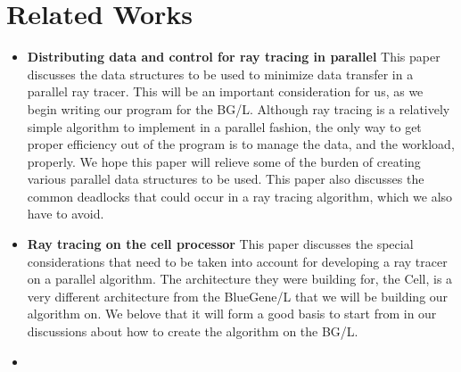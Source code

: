 \documentclass{acmsiggraph}
\begin{document}
\section*{Related Works}

\begin{itemize}
\item
\textbf{Distributing data and control for ray tracing in parallel} This paper
discusses the data structures to be used to minimize data transfer in a
parallel ray tracer. This will be an important consideration for us, as we
begin writing our program for the BG/L. Although ray tracing is a relatively
simple algorithm to implement in a parallel fashion, the only way to get proper
efficiency out of the program is to manage the data, and the workload,
properly. We hope this paper will relieve some of the burden of creating
various parallel data structures to be used. This paper also discusses the
common deadlocks that could occur in a ray tracing algorithm, which we also
have to avoid.\cite{badouel1994dda}
\item
\textbf{Ray tracing on the cell processor} This paper discusses the special
considerations that need to be taken into account for developing a ray tracer
on a parallel algorithm. The architecture they were building for, the Cell, is
a very different architecture from the BlueGene/L that we will be building our
algorithm on. We belove that it will form a good basis to start from in our
discussions about how to create the algorithm on the BG/L.\cite{benthin2006rtc}
\item
\end{itemize}



\end{document}
